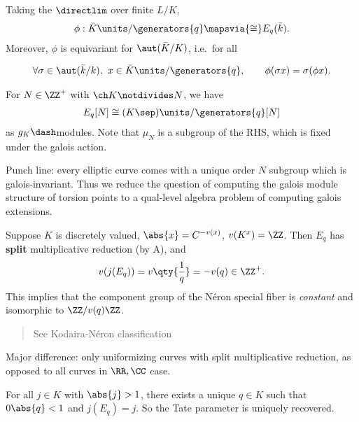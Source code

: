 Taking the \(\directlim\) over finite \(L/K\),
\begin{align*}
\phi: \bar K\units /\generators{q} \mapsvia{\cong} E_q(\bar k)
.\end{align*} Moreover, \(\phi\) is equivariant for \(\aut(\bar K/K)\),
i.e.~for all

\begin{align*}
\forall \sigma \in \aut(\bar k/k),~ x\in \bar K\units/\generators{q}, \quad\quad \phi(\sigma x) = \sigma(\phi x)
.\end{align*}

For \(N \in \ZZ^+\) with \(\ch K \notdivides N\), we have
\begin{align*}
E_q[N] \cong (K\sep)\units / \generators{q} [N]
\end{align*} as \(g_K\dash\)modules. Note that \(\mu_N\) is a subgroup
of the RHS, which is fixed under the galois action.

Punch line: every elliptic curve comes with a unique order \(N\)
subgroup which is galois-invariant. Thus we reduce the question of
computing the galois module structure of torsion points to a qual-level
algebra problem of computing galois extensions.

\begin{description}
\tightlist
\item[Theorem (Tate, Part C)]
Suppose \(K\) is discretely valued, \(\abs{x} = C^{-v(x)}\),
\(v(K^x) = \ZZ\). Then \(E_q\) has \textbf{split} multiplicative
reduction (by A), and
\begin{align*}
  v(j(E_q)) = v\qty{\frac 1 q} = -v(q) \in \ZZ^+
  .\end{align*} This implies that the component group of the Néron
special fiber is \emph{constant} and isomorphic to \(\ZZ/v(q)\ZZ\).
\end{description}

\begin{quote}
See Kodaira-Néron classification
\end{quote}

Major difference: only uniformizing curves with split multiplicative
reduction, as opposed to all curves in \(\RR, \CC\) case.

\begin{description}
\tightlist
\item[Theorem (Tate, Part D)]
For all \(j\in K\) with \(\abs{j} > 1\), there exists a unique
\(q\in K\) such that \(0 \abs{q} < 1\) and \(j(E_q) = j\). So the Tate
parameter is uniquely recovered.
\end{description}

